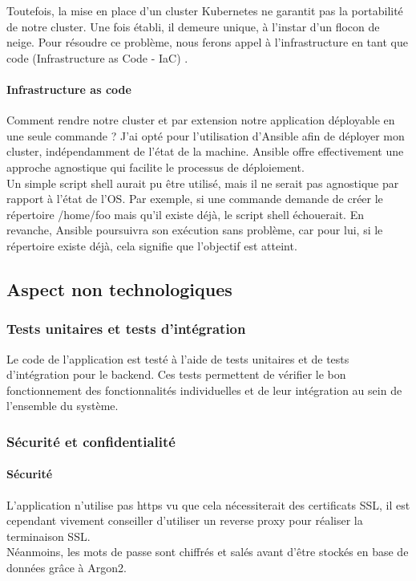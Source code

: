 Toutefois, la mise en place d'un cluster Kubernetes ne garantit pas la portabilité de notre cluster.
Une fois établi, il demeure unique, à l'instar d'un flocon de neige.
Pour résoudre ce problème, nous ferons appel à l'infrastructure en tant que code (Infrastructure as Code - IaC) .

\paragraph{Infrastructure as code}
Comment rendre notre cluster et par extension notre application déployable en une seule commande ?
J'ai opté pour l'utilisation d'Ansible afin de déployer mon cluster, indépendamment de l'état de la machine.
Ansible offre effectivement une approche agnostique qui facilite le processus de déploiement.\\

Un simple script shell aurait pu être utilisé, mais il ne serait pas agnostique par rapport à l'état de l'OS\@.
Par exemple, si une commande demande de créer le répertoire /home/foo mais qu'il existe déjà, le script shell échouerait.
En revanche, Ansible poursuivra son exécution sans problème, car pour lui, si le répertoire existe déjà, cela signifie que l'objectif est atteint.\\

\subsection{Aspect non technologiques}\label{subsec:aspect-non-technologiques}

\subsubsection{Tests unitaires et tests d'intégration}

Le code de l'application est testé à l'aide de tests unitaires et de tests d'intégration pour le backend.
Ces tests permettent de vérifier le bon fonctionnement des fonctionnalités individuelles et de leur intégration au sein de l'ensemble du système.

\subsubsection{Sécurité et confidentialité}

\paragraph{Sécurité}
L'application n'utilise pas \Gls{https} vu que cela nécessiterait des certificats SSL, il est cependant vivement conseiller d'utiliser un reverse proxy pour réaliser la terminaison SSL.\\
Néanmoins, les mots de passe sont chiffrés et salés avant d'être stockés en base de données grâce à Argon2.\\

